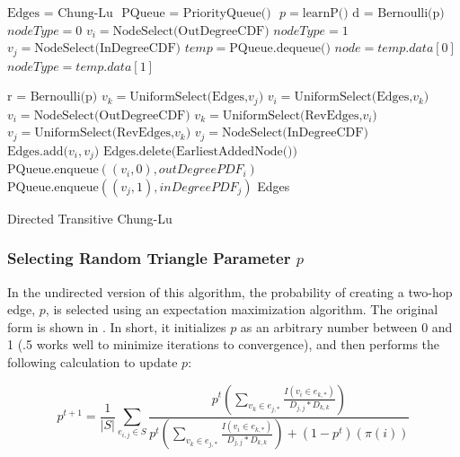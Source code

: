 \documentclass[pdftex,11pt,a4paper,twocolumn]{scrartcl}
\begin{document}
\begin{algorithm}[H]
\begin{minipage}{\columnwidth}
\begin{algorithmic} 
\STATE $\mbox{Edges = Chung-Lu }$
\STATE $\mbox{PQueue = PriorityQueue() }$
\STATE $p = \mbox{learnP()}$
\STATE $\mbox{d = Bernoulli(p)}$
\STATE $nodeType = 0$
\STATE $v_i = \mbox{NodeSelect(OutDegreeCDF)}$
\ELSE
\STATE $nodeType = 1$
\STATE $v_j = \mbox{NodeSelect(InDegreeCDF)}$
\ENDIF
\ELSE %
\STATE $temp = \mbox{PQueue.dequeue()}$
\STATE $node = temp.data[0]$
\STATE $nodeType = temp.data[1]$
\ENDIF

\STATE $\mbox{r = Bernoulli(p)}$
\STATE $v_k = \mbox{UniformSelect(Edges,}v_j)$
\STATE $v_i = \mbox{UniformSelect(Edges,}v_k)$
\ELSE
\STATE $v_i = \mbox{NodeSelect(OutDegreeCDF)}$
\ENDIF
\ELSE
{}
\STATE $v_k = \mbox{UniformSelect(RevEdges,}v_i)$
\STATE $v_j = \mbox{UniformSelect(RevEdges,}v_k)$
\ELSE
\STATE $v_j = \mbox{NodeSelect(InDegreeCDF)}$
\ENDIF
\ENDIF
\STATE $\mbox{Edges.add(}v_i,v_j\mbox{)}$
\STATE $\mbox{Edges.delete(EarliestAddedNode())}$
\ELSE
\STATE $\mbox{PQueue.enqueue}((v_i,0),outDegreePDF_i)$
\STATE $\mbox{PQueue.enqueue}((v_j,1),inDegreePDF_j)$
\ENDIF
\ENDFOR
\RETURN Edges
\end{algorithmic}
\caption{Directed Transitive Chung-Lu}
\label{fig:TCL}
\end{minipage}
\end{algorithm}



\subsubsection{Selecting Random Triangle Parameter $p$}

In the undirected version of this algorithm, the probability of creating a two-hop edge, $p$, is selected using an expectation maximization algorithm. The original form is shown in \cite{fgls}. In short, it initializes $p$ as an arbitrary number between 0 and 1 (.5 works well to minimize iterations to convergence), and then performs the following calculation to update $p$:

\tiny
\begin{equation*}
p^{t+1} = \frac{1}{|S|} \sum_{e_{i,j} \in S} \frac{p^t(\sum_{v_k \in e_{j,*}} \frac{I(v_i \in e_{k,*})}{D_{j,j}*D_{k,k}})}{p^t(\sum_{v_k \in e_{j,*}} \frac{I(v_i \in e_{k,*})}{D_{j,j}*D_{k,k}}) + (1-p^t)(\pi(i))}
\end{equation*}
\normalsize
\end{document}
